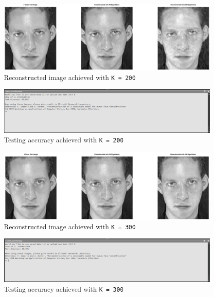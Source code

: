 \documentclass[a4paper]{article}
\begin{document}
\begin{figure}[H]
    \centering
    \includegraphics[width=\textwidth]{./images/200rec.png}
    \caption{Reconstructed image achieved with \texttt{K = 200}}
\end{figure}
\begin{figure}[H]
    \centering
    \includegraphics[width=\textwidth]{./images/200acc.png}
    \caption{Testing accuracy achieved with \texttt{K = 200}}
\end{figure}

\begin{figure}[H]
    \centering
    \includegraphics[width=\textwidth]{./images/300rec.png}
    \caption{Reconstructed image achieved with \texttt{K = 300}}
\end{figure}
\begin{figure}[H]
    \centering
    \includegraphics[width=\textwidth]{./images/300acc.png}
    \caption{Testing accuracy achieved with \texttt{K = 300}}
\end{figure}
\end{document}

